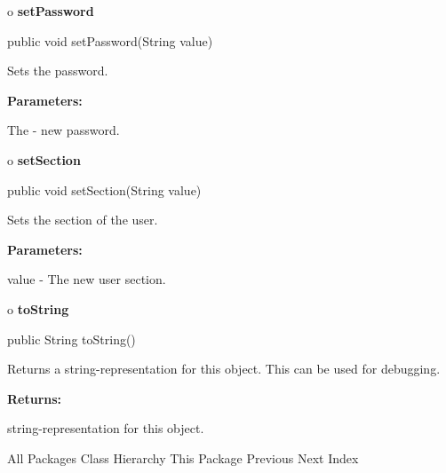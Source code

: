 o {\bf setPassword} 

\begin{PRE}
 public void setPassword(String value)
\end{PRE}

\begin{description}
\htmlDD Sets the password. 

\begin{description}
\item {\bf Parameters:}  

The - new password.  
\end{description}

\end{description}

o {\bf setSection} 

\begin{PRE}
 public void setSection(String value)
\end{PRE}

\begin{description}
\htmlDD Sets the section of the user. 

\begin{description}
\item {\bf Parameters:}  

value - The new user section.  
\end{description}

\end{description}

o {\bf toString} 

\begin{PRE}
 public String toString()
\end{PRE}

\begin{description}
\htmlDD Returns a string-representation for this object. This can be used for
debugging. 

\begin{description}
\item {\bf Returns:}  

string-representation for this object.  
\end{description}

\end{description}

\htmlHR

\begin{PRE}
All Packages  Class Hierarchy  This Package  Previous  Next  Index
\end{PRE}

